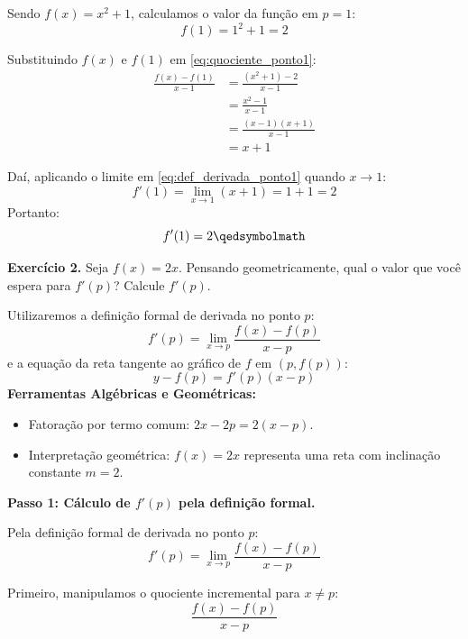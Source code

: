 \begin{enumerate}[label=\alph*)]
    Sendo $f(x) = x^2 + 1$, calculamos o valor da função em $p = 1$:
    \[
    f(1) = 1^2 + 1 = 2
    \]

    Substituindo $f(x)$ e $f(1)$ em \eqref{eq:quociente_ponto1}:
    \begin{align*}
        \frac{f(x) - f(1)}{x - 1} &= \frac{(x^2 + 1) - 2}{x - 1} \\[0.25cm]
        &= \frac{x^2 - 1}{x - 1} \\[0.25cm]
        &= \frac{(x - 1)(x + 1)}{x - 1} \\[0.25cm]
        &= x + 1
    \end{align*}

    Daí, aplicando o limite em \eqref{eq:def_derivada_ponto1} quando $x \to 1$:
    \[
    f'(1) = \lim_{x \to 1} (x + 1) = 1 + 1 = 2
    \]
    Portanto:
    \[
    f'(1) = 2 \qedsymbolmath
    \]
\end{enumerate}

\vspace{0.6cm}
\noindent\textbf{Exercício 2.} Seja $f(x) = 2x$. Pensando geometricamente, qual o valor que você espera para $f'(p)$? Calcule $f'(p)$.
\setcounter{equation}{0}

\begin{recursosbox}[title=Recursos Utilizados]
Utilizaremos a definição formal de derivada no ponto $p$:
\[
f'(p) = \lim_{x \to p} \frac{f(x) - f(p)}{x - p}
\]
e a equação da reta tangente ao gráfico de $f$ em $(p, f(p))$:
\[
y - f(p) = f'(p)(x - p)
\]
\textbf{Ferramentas Algébricas e Geométricas:}
\begin{itemize}[noitemsep, topsep=2pt]
    \item Fatoração por termo comum: $2x - 2p = 2(x - p)$.
    \item Interpretação geométrica: $f(x) = 2x$ representa uma reta com inclinação constante $m = 2$.
\end{itemize}
\end{recursosbox}

\textbf{Passo 1: Cálculo de $f'(p)$ pela definição formal.}

Pela definição formal de derivada no ponto $p$:
\begin{equation}
    f'(p) = \lim_{x \to p} \frac{f(x) - f(p)}{x - p} \label{eq:def_derivada_ex2}
\end{equation}

Primeiro, manipulamos o quociente incremental para $x \neq p$:
\begin{equation}
    \frac{f(x) - f(p)}{x - p} \label{eq:quociente_ex2}
\end{equation}

